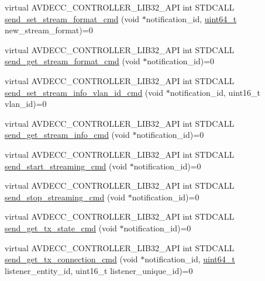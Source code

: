 \begin{DoxyCompactItemize}
virtual A\+V\+D\+E\+C\+C\+\_\+\+C\+O\+N\+T\+R\+O\+L\+L\+E\+R\+\_\+\+L\+I\+B32\+\_\+\+A\+PI int S\+T\+D\+C\+A\+LL \hyperlink{classavdecc__lib_1_1stream__output__descriptor_a7407f2ca9a5a63a404e5f96ccdbf31f3}{send\+\_\+set\+\_\+stream\+\_\+format\+\_\+cmd} (void $\ast$notification\+\_\+id, \hyperlink{parse_8c_aec6fcb673ff035718c238c8c9d544c47}{uint64\+\_\+t} new\+\_\+stream\+\_\+format)=0
\item 
virtual A\+V\+D\+E\+C\+C\+\_\+\+C\+O\+N\+T\+R\+O\+L\+L\+E\+R\+\_\+\+L\+I\+B32\+\_\+\+A\+PI int S\+T\+D\+C\+A\+LL \hyperlink{classavdecc__lib_1_1stream__output__descriptor_a4ba58b32ff7b9f5d961a0a5eb46d4c6c}{send\+\_\+get\+\_\+stream\+\_\+format\+\_\+cmd} (void $\ast$notification\+\_\+id)=0
\item 
virtual A\+V\+D\+E\+C\+C\+\_\+\+C\+O\+N\+T\+R\+O\+L\+L\+E\+R\+\_\+\+L\+I\+B32\+\_\+\+A\+PI int S\+T\+D\+C\+A\+LL \hyperlink{classavdecc__lib_1_1stream__output__descriptor_ac68755a252c54347ac7ec516133081a9}{send\+\_\+set\+\_\+stream\+\_\+info\+\_\+vlan\+\_\+id\+\_\+cmd} (void $\ast$notification\+\_\+id, uint16\+\_\+t vlan\+\_\+id)=0
\item 
virtual A\+V\+D\+E\+C\+C\+\_\+\+C\+O\+N\+T\+R\+O\+L\+L\+E\+R\+\_\+\+L\+I\+B32\+\_\+\+A\+PI int S\+T\+D\+C\+A\+LL \hyperlink{classavdecc__lib_1_1stream__output__descriptor_af1004affeb5ff3cf8bb9356ebcaa3aae}{send\+\_\+get\+\_\+stream\+\_\+info\+\_\+cmd} (void $\ast$notification\+\_\+id)=0
\item 
virtual A\+V\+D\+E\+C\+C\+\_\+\+C\+O\+N\+T\+R\+O\+L\+L\+E\+R\+\_\+\+L\+I\+B32\+\_\+\+A\+PI int S\+T\+D\+C\+A\+LL \hyperlink{classavdecc__lib_1_1stream__output__descriptor_a9b919107737ba0b3d86c2c316cf3a765}{send\+\_\+start\+\_\+streaming\+\_\+cmd} (void $\ast$notification\+\_\+id)=0
\item 
virtual A\+V\+D\+E\+C\+C\+\_\+\+C\+O\+N\+T\+R\+O\+L\+L\+E\+R\+\_\+\+L\+I\+B32\+\_\+\+A\+PI int S\+T\+D\+C\+A\+LL \hyperlink{classavdecc__lib_1_1stream__output__descriptor_a3a5df38802b65e88b6adb330361e4fdf}{send\+\_\+stop\+\_\+streaming\+\_\+cmd} (void $\ast$notification\+\_\+id)=0
\item 
virtual A\+V\+D\+E\+C\+C\+\_\+\+C\+O\+N\+T\+R\+O\+L\+L\+E\+R\+\_\+\+L\+I\+B32\+\_\+\+A\+PI int S\+T\+D\+C\+A\+LL \hyperlink{classavdecc__lib_1_1stream__output__descriptor_a375f5a65c3267d9eaa2b92496d0c2c92}{send\+\_\+get\+\_\+tx\+\_\+state\+\_\+cmd} (void $\ast$notification\+\_\+id)=0
\item 
virtual A\+V\+D\+E\+C\+C\+\_\+\+C\+O\+N\+T\+R\+O\+L\+L\+E\+R\+\_\+\+L\+I\+B32\+\_\+\+A\+PI int S\+T\+D\+C\+A\+LL \hyperlink{classavdecc__lib_1_1stream__output__descriptor_a90b93e5bd071ce7b57fa1dfd57b6d183}{send\+\_\+get\+\_\+tx\+\_\+connection\+\_\+cmd} (void $\ast$notification\+\_\+id, \hyperlink{parse_8c_aec6fcb673ff035718c238c8c9d544c47}{uint64\+\_\+t} listener\+\_\+entity\+\_\+id, uint16\+\_\+t listener\+\_\+unique\+\_\+id)=0

\end{DoxyCompactItemize}
